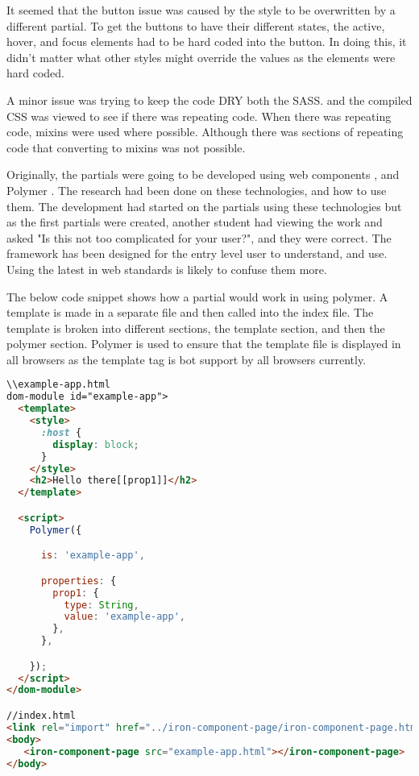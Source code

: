 It seemed that the button issue was caused by the style to be overwritten by a different partial. To get the buttons to have their different states, the active, hover, and focus elements had to be hard coded into the button. In doing this, it didn't matter what other styles might override the values as the elements were hard coded.

A minor issue was trying to keep the code DRY both the SASS. and the compiled CSS was viewed to see if there was repeating code. When there was repeating code, mixins were used where possible. Although there was sections of repeating code that converting to mixins was not possible. 

Originally, the partials were going to be developed using web components \citet{Web17}, and Polymer \citet{Google17b}. The research had been done on these technologies, and how to use them. The development had started on the partials using these technologies but as the first partials were created, another student had viewing the work and asked "Is this not too complicated for your user?", and they were correct. The framework has been designed for the entry level user to understand, and use. Using the latest in web standards is likely to confuse them more. 

The below code snippet shows how a partial would work in using polymer. A template is made in a separate file and then called into the index file. The template is broken into different sections, the template section, and then the polymer section. Polymer is used to ensure that the template file is displayed in all browsers as the template tag is bot support by all browsers currently. 

\begin{lstlisting}[language=HTML]
\\example-app.html
dom-module id="example-app">
  <template>
    <style>
      :host {
        display: block;
      }
    </style>
    <h2>Hello there[[prop1]]</h2>
  </template>

  <script>
    Polymer({

      is: 'example-app',

      properties: {
        prop1: {
          type: String,
          value: 'example-app',
        },
      },

    });
  </script>
</dom-module>

//index.html
<link rel="import" href="../iron-component-page/iron-component-page.html">
<body>
   <iron-component-page src="example-app.html"></iron-component-page>
</body>
\end{lstlisting}


